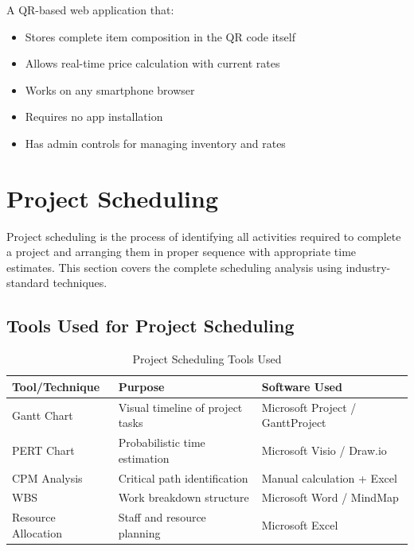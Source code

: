 \documentclass[12pt,a4paper]{article}
\begin{document}
A QR-based web application that:
\begin{itemize}
    \item Stores complete item composition in the QR code itself
    \item Allows real-time price calculation with current rates
    \item Works on any smartphone browser
    \item Requires no app installation
    \item Has admin controls for managing inventory and rates
\end{itemize}

\section{Project Scheduling}

Project scheduling is the process of identifying all activities required to complete a project and arranging them in proper sequence with appropriate time estimates. This section covers the complete scheduling analysis using industry-standard techniques.

\subsection{Tools Used for Project Scheduling}

\begin{table}[H]
\centering
\begin{tabular}{|l|p{6cm}|p{5cm}|}
\hline
\textbf{Tool/Technique} & \textbf{Purpose} & \textbf{Software Used} \\
\hline
Gantt Chart & Visual timeline of project tasks & Microsoft Project / GanttProject \\
\hline
PERT Chart & Probabilistic time estimation & Microsoft Visio / Draw.io \\
\hline
CPM Analysis & Critical path identification & Manual calculation + Excel \\
\hline
WBS & Work breakdown structure & Microsoft Word / MindMap \\
\hline
Resource Allocation & Staff and resource planning & Microsoft Excel \\
\hline
\end{tabular}
\caption{Project Scheduling Tools Used}
\end{table}
\end{document}

